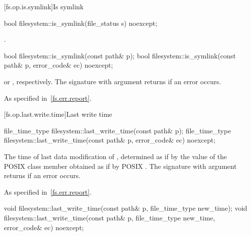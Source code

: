 [fs.op.is.symlink]{Is symlink}

%
\begin{itemdecl}
bool filesystem::is_symlink(file_status s) noexcept;
\end{itemdecl}

\begin{itemdescr}
\pnum
\returns
{}.
\end{itemdescr}

%
\begin{itemdecl}
bool filesystem::is_symlink(const path& p);
bool filesystem::is_symlink(const path& p, error_code& ec) noexcept;
\end{itemdecl}

\begin{itemdescr}
\pnum
\returns
{} or ,
  respectively. The signature with argument  returns 
  if an error occurs.

\pnum
\throws
As specified in~\ref{fs.err.report}.
\end{itemdescr}


[fs.op.last.write.time]{Last write time}

%
\begin{itemdecl}
file_time_type filesystem::last_write_time(const path& p);
file_time_type filesystem::last_write_time(const path& p, error_code& ec) noexcept;
\end{itemdecl}

\begin{itemdescr}
\pnum
\returns
The time of last data modification of ,
  determined as if by the value of the POSIX  class member 
  obtained as if by POSIX .
  The signature with argument  returns 
  if an error occurs.

\pnum
\throws
As specified in~\ref{fs.err.report}.
\end{itemdescr}

%
\begin{itemdecl}
void filesystem::last_write_time(const path& p, file_time_type new_time);
void filesystem::last_write_time(const path& p, file_time_type new_time,
                     error_code& ec) noexcept;
\end{itemdecl}

